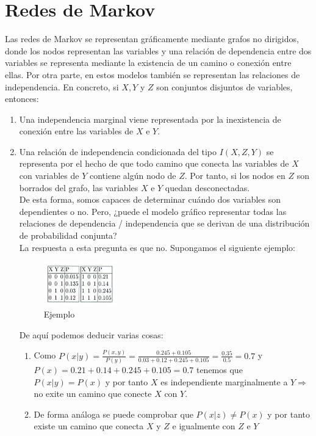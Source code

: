 \documentclass{article}
\begin{document}
\section{Redes de Markov}
Las redes de Markov se representan gráficamente mediante grafos no dirigidos, donde los nodos representan las variables y una relación de dependencia entre dos variables se representa mediante la existencia de un camino o conexión entre ellas. Por otra parte, en estos modelos también se representan las relaciones de independencia. En concreto, si $X,Y$ y $Z$ son conjuntos disjuntos de variables, entonces:
\begin{enumerate}
\item Una independencia marginal viene representada por la inexistencia de conexión entre las variables de $X$ e $Y$.
\item Una relación de independencia condicionada del tipo $I(X,Z,Y)$ se representa por el hecho de que todo camino que conecta las variables de $X$ con variables de $Y$ contiene algún nodo de $Z$. Por tanto, si los nodos en $Z$ son borrados del grafo, las variables $X$ e $Y$ quedan desconectadas.\\
De esta forma, somos capaces de determinar cuándo dos variables son dependientes o no. Pero, ¿puede el modelo gráfico representar todas las relaciones de dependencia / independencia que se derivan de una distribución de probabilidad conjunta?\\
La respuesta a esta pregunta es que no. Supongamos el siguiente ejemplo:
\begin{figure}[H]
\centering
\includegraphics[width=0.3\textwidth]{ejemplo}
\caption{Ejemplo} \label{fig:ejemplo}
\end{figure}

De aquí podemos deducir varias cosas:
\begin{enumerate}
\item Como $P(x|y)=\frac{P(x,y)}{P(y)} = \frac{0.245+0.105}{0.03+0.12+0.245+0.105} = \frac{0.35}{0.5} = 0.7$ y $P(x)=0.21+0.14+0.245+0.105 = 0.7$ tenemos que $P(x|y)=P(x)$ y por tanto $X$ es independiente marginalmente a $Y \Rightarrow$ no exite un camino que conecte $X$ con $Y$.
\item De forma análoga se puede comprobar que $P(x|z)\neq P(x)$ y por tanto existe un camino que conecta $X$ y $Z$ e igualmente con $Z$ e $Y$
\end{enumerate}


\end{enumerate}
\end{document}
